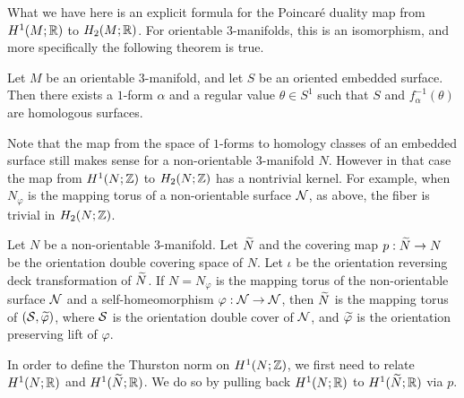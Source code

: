 What we have here is an explicit formula for the Poincar\'e duality map from $H^1(M; \mathbb{R})$ to $H_2(M; \mathbb{R})$.
For orientable $3$-manifolds, this is an isomorphism, and more specifically the following theorem is true.
\begin{thm}
  \label{thm:orientable-poincare-duality}
  Let $M$ be an orientable $3$-manifold, and let $S$ be an oriented embedded surface. Then there exists a $1$-form
  $\alpha$ and a regular value $\theta \in S^1$ such that $S$ and $f_{\alpha}^{-1}(\theta)$ are homologous surfaces.
\end{thm}

Note that the map from the space of $1$-forms to homology classes of an embedded surface still makes sense for a non-orientable $3$-manifold $N$.
However in that case the map from $H^1(N; \mathbb{Z})$ to $H_2(N; \mathbb{Z})$ has a nontrivial kernel.  For example, when $N_{\varphi}$ is the mapping torus of a non-orientable surface $\mathcal{N}$, as above, the fiber is trivial in $H_2(N;\mathbb{Z})$.

Let $N$ be a non-orientable $3$-manifold.  Let $\widetilde{N}$ and the covering map $p:\widetilde{N}\rightarrow N$ be the orientation double covering space of $N$.
Let $\iota$ be the orientation reversing deck transformation
of $\widetilde{N}$.
If $N=N_\varphi$ is the mapping torus of the non-orientable surface $\mathcal{N}$ and a self-homeomorphism $\varphi: \mathcal{N} \to \mathcal{N}$, then $\widetilde{N}$ is the mapping torus of $(\mathcal{S}, \widetilde{\varphi})$, where $\mathcal{S}$ is the orientation double cover of $\mathcal{N}$, and $\widetilde{\varphi}$ is the orientation preserving lift of $\varphi$.

 In order to define the Thurston norm on $H^1(N;\mathbb{Z})$, we first need to relate $H^1(N; \mathbb{R})$ and $H^1(\widetilde{N}; \mathbb{R})$.
We do so by pulling back $H^1(N;\mathbb{R})$ to $H^1(\widetilde{N};\mathbb{R})$ via $p$.

